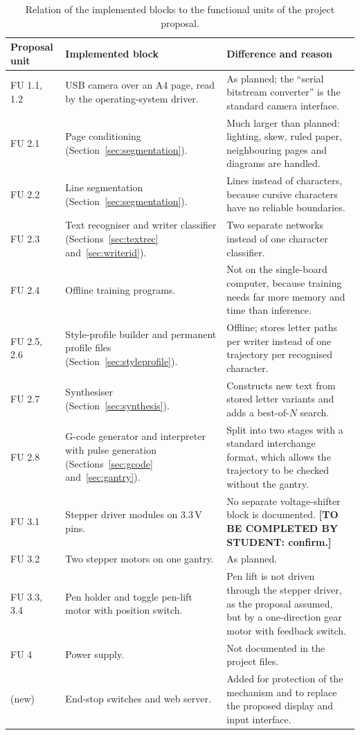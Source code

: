 \begin{table}[h]
\centering
\fontsize{9.5}{11.5}\selectfont
\begin{tabularx}{\linewidth}{|p{1.5cm}|X|X|}
\hline
\textbf{Proposal unit} & \textbf{Implemented block} & \textbf{Difference and reason} \\
\hline
FU 1.1, 1.2 & USB camera over an A4 page, read by the operating-system driver. & As planned; the ``serial bitstream converter'' is the standard camera interface. \\
\hline
FU 2.1 & Page conditioning (Section~\ref{sec:segmentation}). & Much larger than planned: lighting, skew, ruled paper, neighbouring pages and diagrams are handled. \\
\hline
FU 2.2 & Line segmentation (Section~\ref{sec:segmentation}). & Lines instead of characters, because cursive characters have no reliable boundaries. \\
\hline
FU 2.3 & Text recogniser and writer classifier (Sections~\ref{sec:textrec} and~\ref{sec:writerid}). & Two separate networks instead of one character classifier. \\
\hline
FU 2.4 & Offline training programs. & Not on the single-board computer, because training needs far more memory and time than inference. \\
\hline
FU 2.5, 2.6 & Style-profile builder and permanent profile files (Section~\ref{sec:styleprofile}). & Offline; stores letter paths per writer instead of one trajectory per recognised character. \\
\hline
FU 2.7 & Synthesiser (Section~\ref{sec:synthesis}). & Constructs new text from stored letter variants and adds a best-of-$N$ search. \\
\hline
FU 2.8 & G-code generator and interpreter with pulse generation (Sections~\ref{sec:gcode} and~\ref{sec:gantry}). & Split into two stages with a standard interchange format, which allows the trajectory to be checked without the gantry. \\
\hline
FU 3.1 & Stepper driver modules on 3.3\,V pins. & No separate voltage-shifter block is documented. \textbf{[TO BE COMPLETED BY STUDENT: confirm.]} \\
\hline
FU 3.2 & Two stepper motors on one gantry. & As planned. \\
\hline
FU 3.3, 3.4 & Pen holder and toggle pen-lift motor with position switch. & Pen lift is not driven through the stepper driver, as the proposal assumed, but by a one-direction gear motor with feedback switch. \\
\hline
FU 4 & Power supply. & Not documented in the project files. \\
\hline
(new) & End-stop switches and web server. & Added for protection of the mechanism and to replace the proposed display and input interface. \\
\hline
\end{tabularx}
\caption{Relation of the implemented blocks to the functional units of the project proposal.}
\label{tab:des-fumap}
\end{table}


